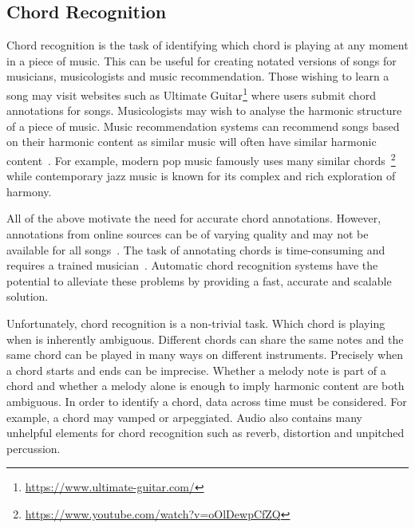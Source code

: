 \subsection{Chord Recognition}

Chord recognition is the task of identifying which chord is playing at any moment in a piece of music. This can be useful for creating notated versions of songs for musicians, musicologists and music recommendation. Those wishing to learn a song may visit websites such as Ultimate Guitar\footnote{\url{https://www.ultimate-guitar.com/}} where users submit chord annotations for songs. Musicologists may wish to analyse the harmonic structure of a piece of music. Music recommendation systems can recommend songs based on their harmonic content as similar music will often have similar harmonic content~\citep{MusicGenreClassification}. For example, modern pop music famously uses many similar chords~\footnote{\url{https://www.youtube.com/watch?v=oOlDewpCfZQ}} while contemporary jazz music is known for its complex and rich exploration of harmony. 

All of the above motivate the need for accurate chord annotations. However, annotations from online sources can be of varying quality and may not be available for all songs~\citep{Choco}. The task of annotating chords is time-consuming and requires a trained musician~\citep{McgillBillboard}. Automatic chord recognition systems have the potential to alleviate these problems by providing a fast, accurate and scalable solution.

Unfortunately, chord recognition is a non-trivial task. Which chord is playing when is inherently ambiguous. Different chords can share the same notes and the same chord can be played in many ways on different instruments. Precisely when a chord starts and ends can be imprecise. Whether a melody note is part of a chord and whether a melody alone is enough to imply harmonic content are both ambiguous. In order to identify a chord, data across time must be considered. For example, a chord may vamped or arpeggiated. Audio also contains many unhelpful elements for chord recognition such as reverb, distortion and unpitched percussion.


